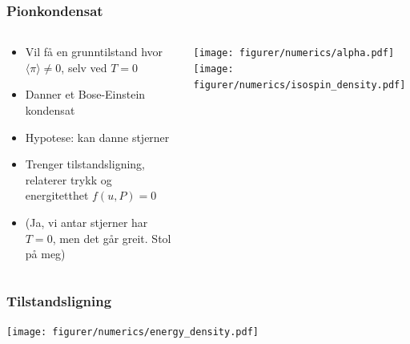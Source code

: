 \documentclass[aspectratio=169]{beamer}
\begin{document}
    \begin{frame}
        \frametitle{Pionkondensat}
        \begin{columns}
            \begin{column}{0.6\textwidth}
                \begin{itemize}
                    \vspace{-0.5cm}
                    \itemsep 0.8cm
                    \item Vil få en grunntilstand hvor $\langle \pi \rangle \neq 0$, selv ved $T = 0$
                    \item Danner et Bose-Einstein kondensat
                    \item Hypotese: kan danne stjerner
                    \item Trenger tilstandsligning, relaterer trykk og energitetthet $f(u, P) = 0$
                    \item (Ja, vi antar stjerner har $T=0$, men det går greit. Stol på meg)
                \end{itemize}
            \end{column}
            \begin{column}[]{0.5\textwidth}
                \texttt{[image: figurer/numerics/alpha.pdf]}
                \texttt{[image: figurer/numerics/isospin\_density.pdf]}
            \end{column}
        \end{columns}
        \end{frame}

    \begin{frame}
        \frametitle{Tilstandsligning}
        \centering
        \texttt{[image: figurer/numerics/energy\_density.pdf]}
    \end{frame}
\end{document}
